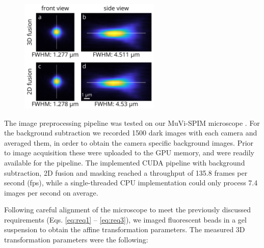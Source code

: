 \begin{figure}
  \centering
  \includegraphics[width=0.6\textwidth]{fusion/beads/2Dvs3Dbeads}
  \label{fig:2Dvs3Dbeads}
\end{figure}

  The image preprocessing pipeline was tested on our MuVi-SPIM microscope \cite{krzic_multiview_2012}. For the background subtraction we recorded 1500 dark images with each camera and averaged them, in order to obtain the camera specific background images. Prior to image acquisition these were uploaded to the GPU memory, and were readily available for the pipeline. The implemented CUDA pipeline with background subtraction, 2D fusion and masking reached a throughput of 135.8 frames per second (fps), while a single-threaded CPU implementation could only process 7.4 images per second on average.

  Following careful alignment of the microscope to meet the previously discussed requirements (Eqs. \ref{eq:req1} -- \ref{eq:req3}), we imaged fluorescent beads in a gel suspension to obtain the affine transformation parameters. The measured 3D transformation parameters were the following:

